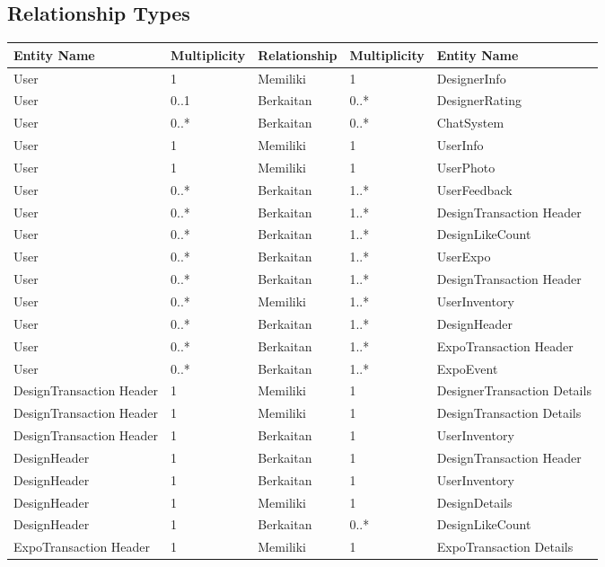 \subsection{Relationship Types}
	\begin{longtable}{| p{3.4cm} | l | l | l | p{3.4cm} |}
		\hline
		Entity Name & Multiplicity & Relationship & Multiplicity & Entity Name \\
		\hline
		User & 1 & Memiliki & 1 & DesignerInfo \\ \hline
		User & 0..1 & Berkaitan & 0..* & DesignerRating \\ \hline
		User & 0..* & Berkaitan & 0..* & ChatSystem \\ \hline
		User & 1 & Memiliki & 1 & UserInfo \\ \hline
		User & 1 & Memiliki & 1 & UserPhoto \\ \hline
		User & 0..* & Berkaitan & 1..* & UserFeedback \\ \hline
		User & 0..* & Berkaitan & 1..* & DesignTransaction Header \\ \hline
		User & 0..* & Berkaitan & 1..* & DesignLikeCount \\ \hline
		User & 0..* & Berkaitan & 1..* & UserExpo \\ \hline
		User & 0..* & Berkaitan & 1..* & DesignTransaction Header \\ \hline
		User & 0..* & Memiliki & 1..* & UserInventory \\ \hline
		User & 0..* & Berkaitan & 1..* & DesignHeader \\ \hline
		User & 0..* & Berkaitan & 1..* & ExpoTransaction Header \\ \hline
		User & 0..* & Berkaitan & 1..* & ExpoEvent \\ \hline
		DesignTransaction Header & 1 & Memiliki & 1 & DesignerTransaction Details \\ \hline
		DesignTransaction Header & 1 & Memiliki & 1 & DesignTransaction Details \\ \hline
		DesignTransaction Header & 1 & Berkaitan & 1 & UserInventory \\ \hline
		DesignHeader & 1 & Berkaitan & 1 & DesignTransaction Header \\ \hline
		DesignHeader & 1 & Berkaitan & 1 & UserInventory \\ \hline
		DesignHeader & 1 & Memiliki & 1 & DesignDetails \\ \hline
		DesignHeader & 1 & Berkaitan & 0..* & DesignLikeCount \\ \hline
		ExpoTransaction Header & 1 & Memiliki & 1 & ExpoTransaction Details \\ \hline

\end{longtable}
